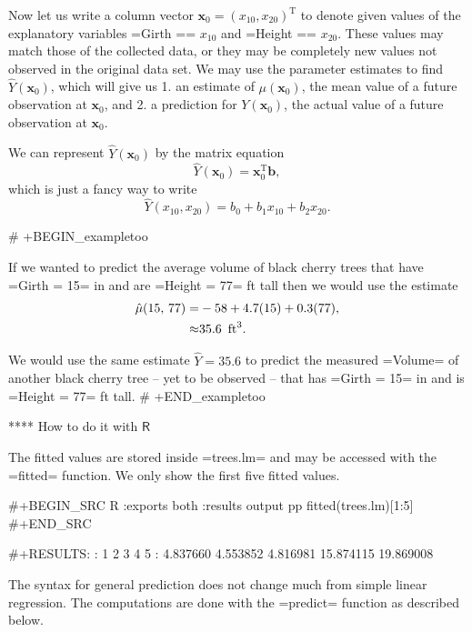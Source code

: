Now let us write a column vector
\(\mathbf{x}_{0}=(x_{10},x_{20})^{\mathrm{T}}\) to denote given values
of the explanatory variables =Girth == \(x_{10}\) and =Height ==
\(x_{20}\). These values may match those of the collected data, or
they may be completely new values not observed in the original data
set. We may use the parameter estimates to find
\(\hat{Y}(\mathbf{x}_{0})\), which will give us
1. an estimate of \(\mu(\mathbf{x}_{0})\), the mean value of a future
   observation at \(\mathbf{x}_{0}\), and
2. a prediction for \(Y(\mathbf{x}_{0})\), the actual value of a
   future observation at \(\mathbf{x}_{0}\).

We can represent \(\hat{Y}(\mathbf{x}_{0})\) by the matrix equation
\begin{equation}
\label{eq-mlr-single-yhat-matrix}
\hat{Y}(\mathbf{x}_{0})=\mathbf{x}_{0}^{\mathrm{T}}\mathbf{b},
\end{equation}
which is just a fancy way to write
\begin{equation}
\hat{Y}(x_{10},x_{20})=b_{0}+b_{1}x_{10}+b_{2}x_{20}.
\end{equation}
 
# +BEGIN_exampletoo

If we wanted to predict the average volume of black cherry trees that
have =Girth = 15= in and are =Height = 77= ft tall then we would use
the estimate
\begin{alignat*}{1}
\hat{\mu}(15,\,77)= & -58+4.7(15)+0.3(77),\\
\approx & 35.6\mbox{\,\ ft}^{3}.
\end{alignat*}

We would use the same estimate \(\hat{Y}=35.6\) to predict the
measured =Volume= of another black cherry tree -- yet to be observed
-- that has =Girth = 15= in and is =Height = 77= ft tall.
# +END_exampletoo

**** How to do it with \(\mathsf{R}\)

The fitted values are stored inside =trees.lm= and may be accessed
with the =fitted= function. We only show the first five fitted values.

#+BEGIN_SRC R :exports both :results output pp 
fitted(trees.lm)[1:5]
#+END_SRC

#+RESULTS:
:         1         2         3         4         5 
:  4.837660  4.553852  4.816981 15.874115 19.869008

The syntax for general prediction does not change much from simple
linear regression. The computations are done with the =predict=
function as described below.

